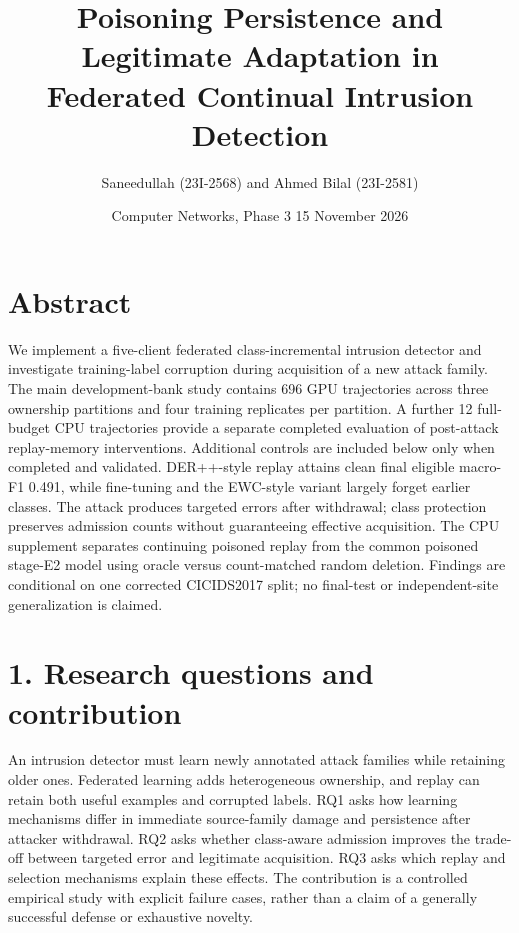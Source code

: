 \documentclass[
  10pt,
]{article}
\title{Poisoning Persistence and Legitimate Adaptation in Federated
Continual Intrusion Detection}
\author{Saneedullah (23I-2568) and Ahmed Bilal (23I-2581)}
\date{Computer Networks, Phase 3 \textbar{} 15 November 2026}
\begin{document}
\maketitle

\hypertarget{abstract}{%
\section{Abstract}\label{abstract}}

We implement a five-client federated class-incremental intrusion
detector and investigate training-label corruption during acquisition of
a new attack family. The main development-bank study contains 696 GPU
trajectories across three ownership partitions and four training
replicates per partition. A further 12 full-budget CPU trajectories
provide a separate completed evaluation of post-attack replay-memory
interventions. Additional controls are included below only when
completed and validated. DER++-style replay attains clean final eligible
macro-F1 0.491, while fine-tuning and the EWC-style variant largely
forget earlier classes. The attack produces targeted errors after
withdrawal; class protection preserves admission counts without
guaranteeing effective acquisition. The CPU supplement separates
continuing poisoned replay from the common poisoned stage-E2 model using
oracle versus count-matched random deletion. Findings are conditional on
one corrected CICIDS2017 split; no final-test or independent-site
generalization is claimed.

\hypertarget{research-questions-and-contribution}{%
\section{1. Research questions and
contribution}\label{research-questions-and-contribution}}

An intrusion detector must learn newly annotated attack families while
retaining older ones. Federated learning adds heterogeneous ownership,
and replay can retain both useful examples and corrupted labels. RQ1
asks how learning mechanisms differ in immediate source-family damage
and persistence after attacker withdrawal. RQ2 asks whether class-aware
admission improves the trade-off between targeted error and legitimate
acquisition. RQ3 asks which replay and selection mechanisms explain
these effects. The contribution is a controlled empirical study with
explicit failure cases, rather than a claim of a generally successful
defense or exhaustive novelty.
\end{document}
